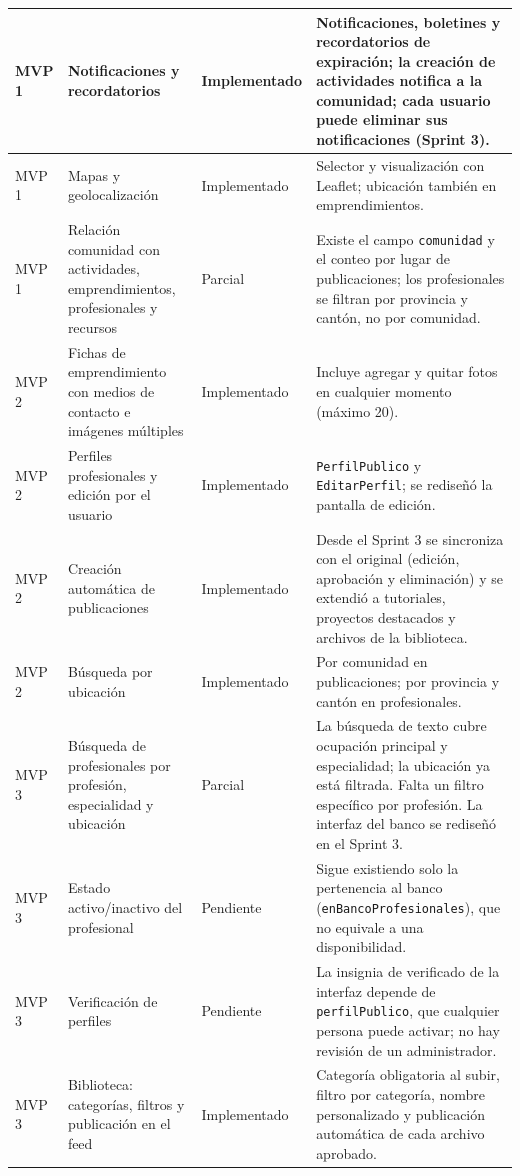 \begin{longtable}{|p{2cm}|p{5.5cm}|p{2.6cm}|p{4.7cm}|}
\hline
MVP 1 & Notificaciones y recordatorios & Implementado & Notificaciones, boletines y recordatorios de expiración; la creación de actividades notifica a la comunidad; cada usuario puede eliminar sus notificaciones (Sprint 3). \\
\hline
MVP 1 & Mapas y geolocalización & Implementado & Selector y visualización con Leaflet; ubicación también en emprendimientos. \\
\hline
MVP 1 & Relación comunidad con actividades, emprendimientos, profesionales y recursos & Parcial & Existe el campo \texttt{comunidad} y el conteo por lugar de publicaciones; los profesionales se filtran por provincia y cantón, no por comunidad. \\
\hline
MVP 2 & Fichas de emprendimiento con medios de contacto e imágenes múltiples & Implementado & Incluye agregar y quitar fotos en cualquier momento (máximo 20). \\
\hline
MVP 2 & Perfiles profesionales y edición por el usuario & Implementado & \texttt{PerfilPublico} y \texttt{EditarPerfil}; se rediseñó la pantalla de edición. \\
\hline
MVP 2 & Creación automática de publicaciones & Implementado & Desde el Sprint 3 se sincroniza con el original (edición, aprobación y eliminación) y se extendió a tutoriales, proyectos destacados y archivos de la biblioteca. \\
\hline
MVP 2 & Búsqueda por ubicación & Implementado & Por comunidad en publicaciones; por provincia y cantón en profesionales. \\
\hline
MVP 3 & Búsqueda de profesionales por profesión, especialidad y ubicación & Parcial & La búsqueda de texto cubre ocupación principal y especialidad; la ubicación ya está filtrada. Falta un filtro específico por profesión. La interfaz del banco se rediseñó en el Sprint 3. \\
\hline
MVP 3 & Estado activo/inactivo del profesional & Pendiente & Sigue existiendo solo la pertenencia al banco (\texttt{enBancoProfesionales}), que no equivale a una disponibilidad. \\
\hline
MVP 3 & Verificación de perfiles & Pendiente & La insignia de verificado de la interfaz depende de \texttt{perfilPublico}, que cualquier persona puede activar; no hay revisión de un administrador. \\
\hline
MVP 3 & Biblioteca: categorías, filtros y publicación en el feed & Implementado & Categoría obligatoria al subir, filtro por categoría, nombre personalizado y publicación automática de cada archivo aprobado. \\

\end{longtable}
